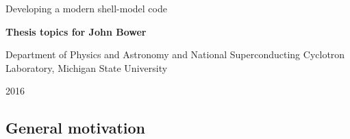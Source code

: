\documentclass[%
oneside,                 %
final,                   %
10pt]{article}
\begin{document}

\newcommand{\exercisesection}[1]{\subsection*{#1}}






\thispagestyle{empty}

\begin{center}
{\LARGE\bf
\begin{spacing}{1.25}
Developing a modern shell-model code
\end{spacing}
}
\end{center}


\begin{center}
{\bf Thesis topics for John Bower}
\end{center}

    \begin{center}
\centerline{{\small Department of Physics and Astronomy and National Superconducting Cyclotron Laboratory, Michigan State University}}
\end{center}
    

\begin{center}
2016
\end{center}

\vspace{1cm}


\subsection{General motivation}

\end{document}
